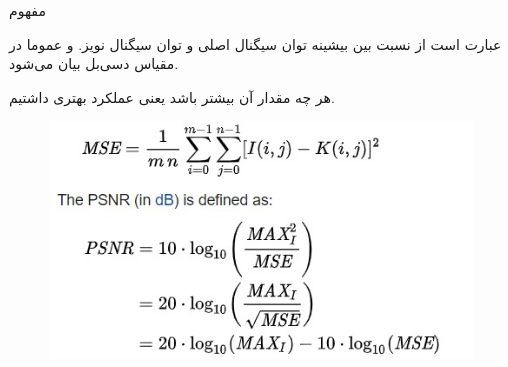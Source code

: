 \SubProblem
{مفهوم }
{
    عبارت است از نسبت بین بیشینه توان سیگنال اصلی و توان سیگنال نویز. و عموما در مقیاس دسی‌بل بیان می‌شود.
    
    هر چه مقدار آن بیشتر باشد یعنی عملکرد بهتری داشتیم.
    
    \begin{figure}[H]
        \includegraphics[]{Images/PSNR.jpg}
        \centering
        \caption{}
    \end{figure}
}
